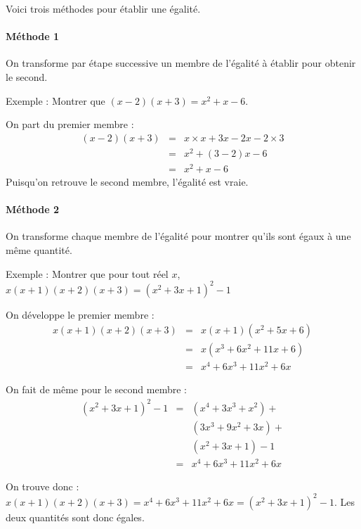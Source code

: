 \documentclass[11pt]{article}
\begin{document}
\begin{exercice}
  Voici trois méthodes pour établir une égalité.
  \paragraph{Méthode 1} On transforme par étape successive un membre de l'égalité à établir pour obtenir le second.

  \begin{em}
    Exemple : Montrer que $(x-2)(x+3)=x^2+x-6$.

    On part du premier membre : 
    \begin{eqnarray*}
      (x-2)(x+3) &=& x\times x + 3x-2x-2\times 3\\
                 &=& x^2 + (3-2)x -6\\
                 &=& x^2 + x - 6
    \end{eqnarray*}
    Puisqu'on retrouve le second membre, l'égalité est vraie.
  \end{em}

  \paragraph{Méthode 2} On transforme chaque membre de l'égalité pour montrer qu'ils sont égaux à une même quantité.

  \begin{em}
    Exemple : Montrer que pour tout réel $x$, $x(x+1)(x+2)(x+3)=(x^2+3x+1)^2-1$

    On développe le premier membre :
    \begin{eqnarray*}
      x(x+1)(x+2)(x+3) &=& x(x+1)(x^2+5x+6)\\
                       &=& x(x^3+6x^2+11x+6)\\
                       &=& x^4+6x^3+11x^2+6x
    \end{eqnarray*}

    On fait de même pour le second membre :
    \begin{eqnarray*}
      (x^2+3x+1)^2-1 &=& (x^4+3x^3+x^2)+\\
                     & & (3x^3+9x^2+3x)+\\
                     & & (x^2+3x+1)-1\\
                     &=& x^4+6x^3+11x^2+6x
    \end{eqnarray*}

    On trouve donc : $x(x+1)(x+2)(x+3)=x^4+6x^3+11x^2+6x=(x^2+3x+1)^2-1$. Les deux quantités sont donc égales.
  \end{em}


\end{exercice}
\end{document}
